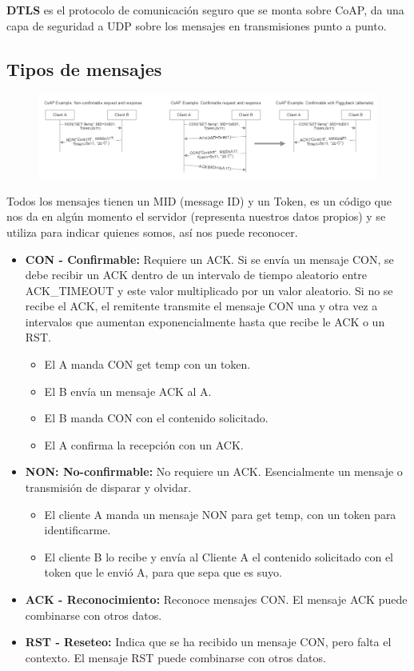 \documentclass[12pt, twoside, openright]{report} %
\begin{document}
\textbf{DTLS} es el protocolo de comunicación seguro que se monta sobre CoAP, da una capa de seguridad a UDP sobre los mensajes en transmisiones punto a punto.

\subsection{Tipos de mensajes}
\begin{figure}[H]
	{\includegraphics[scale=.48]{d5c42d4c-400c-4d55-9eea-96fc5bedf353.png}}
\end{figure}

Todos los mensajes tienen un MID (message ID) y un Token, es un código que nos da en algún momento el servidor (representa nuestros datos propios) y se utiliza para indicar quienes somos, así nos puede reconocer.

\begin{itemize}
	\item \textbf{CON - Confirmable:} Requiere un ACK. Si se envía un mensaje CON, se debe recibir un ACK dentro de un intervalo de tiempo aleatorio entre ACK\_TIMEOUT y este valor multiplicado por un valor aleatorio. Si no se recibe el ACK, el remitente transmite el mensaje CON una y otra vez a intervalos que aumentan exponencialmente hasta que recibe le ACK o un RST.
	      \begin{itemize}
		      \item El A manda CON get \/temp con un token.
		      \item El B envía un mensaje ACK al A.
		      \item El B manda CON con el contenido solicitado.
		      \item El A confirma la recepción con un ACK.
	      \end{itemize}
	\item \textbf{NON: No-confirmable:} No requiere un ACK. Esencialmente un mensaje o transmisión de disparar y olvidar.
	      \begin{itemize}
		      \item El cliente A manda un mensaje NON para get \/temp, con un token para identificarme.
		      \item El cliente B lo recibe y envía al Cliente A el contenido solicitado con el token que le envió A, para que sepa que es suyo.
	      \end{itemize}
	\item \textbf{ACK - Reconocimiento:} Reconoce mensajes CON. El mensaje ACK puede combinarse con otros datos.

	\item \textbf{RST - Reseteo:} Indica que se ha recibido un mensaje CON, pero falta el contexto. El mensaje RST puede combinarse con otros datos.
\end{itemize}
\end{document}
